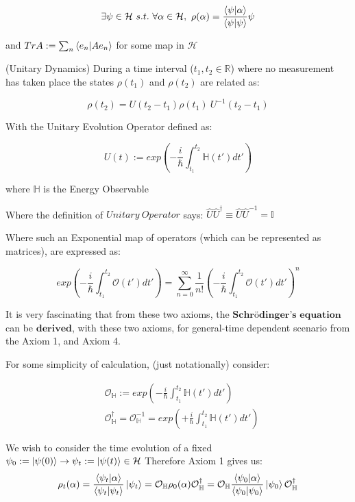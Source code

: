 \documentclass[8pt, twocoloumn]{article}
\begin{document}
\begin{equation} \exists \psi \in \mathcal{H} \ s.t. \ \forall\alpha \in \mathcal{H}, \ \rho(\alpha) = \frac{\braket{\psi|\alpha}}{\braket{\psi|\psi}}\psi 
\end{equation}

and $Tr A := \sum_{n} \braket{e_n| Ae_n}$ for some map in $\mathcal{H}$

\begin{axiom4}

(Unitary Dynamics) During a time interval ($ t_1, t_2 \in 	\mathbb{R}$) where no measurement has taken place the states $\rho(t_1)$ and $\rho(t_2)$ are related as: 

$$ \rho(t_2) = U(t_2-t_1) \rho(t_1) \ U^{-1}(t_2-t_1)$$

With the Unitary Evolution Operator defined as:

$$ U(t) := exp(-\frac{i}{\hbar} \int _{t_1}^{t_2}\mathbb{H}(t')dt')$$

where $\mathbb{H}$ is the Energy Observable

\end{axiom4}


Where the definition of $Unitary \ Operator$ says: $\hat{U} \hat{U}^{\dag} \equiv \hat{U} \hat{U}^{-1}= \mathbb{I} $

Where such an Exponential map of operators (which can be represented as matrices), are expressed as:  


\begin{equation}
exp(-\frac{i}{\hbar}\int _{t_1}^{t_2} \mathcal{O}(t')dt')= \sum_{n=0}^{\infty}\frac{1}{n!}(-\frac{i}{\hbar}\int _{t_1}^{t_2} \mathcal{O}(t')dt')^{n}
\end{equation}

It is very fascinating that from these two axioms, the $\textbf{Schrödinger's equation}$ can be $\textbf{derived}$, with these two axioms, for general-time dependent scenario from the Axiom 1, and Axiom 4. 

For some simplicity of calculation, (just notationally) consider: 

\begin{align}
& \mathcal{O}_{\mathbb{H}} := exp(-\frac{i}{\hbar}\int _{t_1}^{t_2} \mathbb{H}(t')dt')  \ \ \ \ \ \ \ \ \\ 
& \mathcal{O}_{\mathbb{H}}^{\dag}=\mathcal{O}_{\mathbb{H}}^{-1}=exp(+\frac{i}{\hbar}\int _{t_1}^{t_2} \mathbb{H}(t')dt') 
\end{align}

We wish to consider the time evolution of a fixed $\psi_0 := \ket{\psi(0)} \to \psi_t := \ket{\psi(t)} \in \mathcal{H}$ 
Therefore Axiom 1 gives us: 
\begin{equation}
\rho_t(\alpha)= \frac{\braket{\psi_t|\alpha}}{\braket{\psi_t|\psi_t}}\ket{\psi_t} = \mathcal{O}_{\mathbb{H}} \rho_0(\alpha) \mathcal{O}_{\mathbb{H}}^{\dag}= \mathcal{O}_{\mathbb{H}} \frac{\braket{\psi_0|\alpha}}{\braket{\psi_0|\psi_0}}\ket{\psi_0} \mathcal{O}_{\mathbb{H}}^{\dag}
\end{equation}
\end{document}
